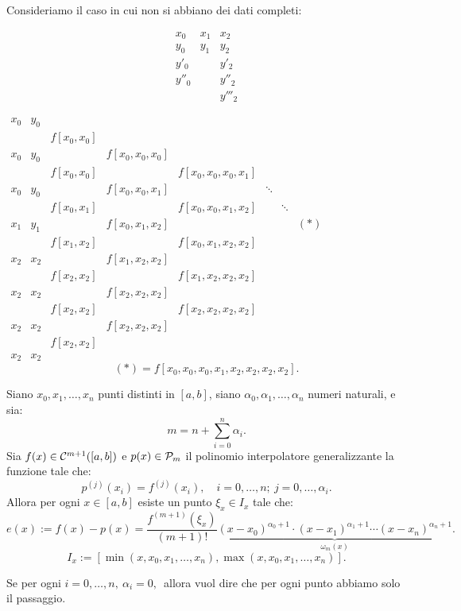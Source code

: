 \begin{exe}
Consideriamo il caso in cui non si abbiano dei dati completi:

\[\begin{array}{lllc}
x_0 & x_1  & x_2  \\
y_0 & y_1 & y_2 \\
y'_0 &   & y'_2 \\
y''_0 & & y''_2 \\
 & & y'''_2
\end{array}\]
\begin{flushleft}
$
\begin{array}{llllllll}
x_0 & y_0  \\
    &     & f[x_0,x_0]  \\
x_0 & y_0 &  & f[x_0,x_0,x_0] \\
    &     & f[x_0,x_0] &   & f[x_0,x_0,x_0,x_1] \\
x_0 & y_0 &  & f[x_0,x_0,x_1] & & \ddots \\
    &     & f[x_0,x_1] &   & f[x_0,x_0,x_1,x_2]  & & \ddots\\
x_1 & y_1 &  & f[x_0,x_1,x_2]  & & & & (*)\\
    &    & f[x_1,x_2] &   & f[x_0,x_1,x_2,x_2] \\
x_2 & x_2 & & f[x_1,x_2,x_2]\\
   &    & f[x_2,x_2] & & f[x_1,x_2,x_2,x_2]\\
x_2 & x_2 & & f[x_2,x_2,x_2] & & \\
   &    & f[x_2,x_2] & & f[x_2,x_2,x_2,x_2]\\
x_2 & x_2 & & f[x_2,x_2,x_2]\\
   &    & f[x_2,x_2] \\
x_2 & x_2
\end{array}
$
\[(*) = f[x_0,x_0,x_0,x_1,x_2,x_2,x_2,x_2].\]
\end{flushleft}
\end{exe}

\begin{teo}
Siano $x_0, x_1, \ldots, x_n$ punti distinti in $[a,b]$, siano $\alpha_0,
\alpha_1, \ldots, \alpha_n$ numeri naturali, e sia:
\[m = n + \sum_{i=0}^n\alpha_i.\]
Sia $f(x) \in \mathcal{C}^{m+1}([a,b])$ e $p(x) \in \mathcal{P}_m$ il polinomio interpolatore
generalizzante la funzione tale che:
\[
p^{(j)}(x_i) = f^{(j)}(x_i), \quad i = 0, \ldots, n; \ j= 0, \ldots, \alpha_i.
\]
Allora per ogni $x \in [a,b]$ esiste un punto $\xi_x \in I_x$ tale che:
\[e(x) := f(x)-p(x) = \frac{f^{(m+1)}(\xi_x)}{(m+1)!}
\underbrace{(x-x_0)^{\alpha_0+1}
\cdot (x-x_1)^{\alpha_1+1} \cdots (x-x_n)^{\alpha_n+1}}_{\omega_m(x)}.\]
\[I_x := [\min(x,x_0,x_1, \ldots, x_n), \max(x,x_0,x_1, \ldots, x_n)].\]
\end{teo}
\begin{osse}
Se per ogni $i = 0,\ldots, n, \ \alpha_i = 0,\, $ allora vuol dire che per
ogni punto abbiamo solo il passaggio.
\end{osse}

